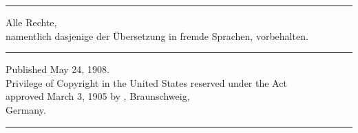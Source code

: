 \vspace*{0.3\textheight}
\begin{center}
\rule{\linewidth}{0.4pt}

\vspace{1.5em}
Alle Rechte,\\
namentlich dasjenige der Übersetzung in fremde Sprachen, vorbehalten.

\vspace{1em}
\rule{3cm}{0.4pt}

\vspace{1em}
Published May 24, 1908.\\
Privilege of Copyright in the United States reserved under the Act\\
approved March 3, 1905 by , Braunschweig,\\
Germany.

\vspace{1.5em}
\rule{\linewidth}{0.4pt}
\end{center}
